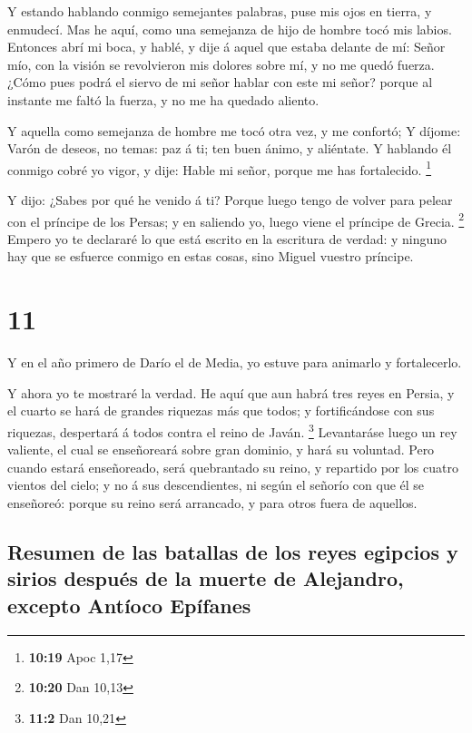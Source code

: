  Y estando hablando conmigo semejantes palabras, puse mis
ojos en tierra, y enmudecí.  Mas he aquí, como una
semejanza de hijo de hombre tocó mis labios. Entonces abrí mi boca, y
hablé, y dije á aquel que estaba delante de mí: Señor mío, con la visión
se revolvieron mis dolores sobre mí, y no me quedó fuerza. 
¿Cómo pues podrá el siervo de mi señor hablar con este mi señor? porque
al instante me faltó la fuerza, y no me ha quedado aliento.

 Y aquella como semejanza de hombre me tocó otra vez, y me
confortó;  Y díjome: Varón de deseos, no temas: paz á ti;
ten buen ánimo, y aliéntate. Y hablando él conmigo cobré yo vigor, y
dije: Hable mi señor, porque me has fortalecido. \footnote{\textbf{10:19}
  Apoc 1,17}

 Y dijo: ¿Sabes por qué he venido á ti? Porque luego tengo
de volver para pelear con el príncipe de los Persas; y en saliendo yo,
luego viene el príncipe de Grecia. \footnote{\textbf{10:20} Dan 10,13}
 Empero yo te declararé lo que está escrito en la escritura
de verdad: y ninguno hay que se esfuerce conmigo en estas cosas, sino
Miguel vuestro príncipe.

\hypertarget{section-10}{%
\section{11}\label{section-10}}

 Y en el año primero de Darío el de Media, yo estuve para
animarlo y fortalecerlo.

 Y ahora yo te mostraré la verdad. He aquí que aun habrá
tres reyes en Persia, y el cuarto se hará de grandes riquezas más que
todos; y fortificándose con sus riquezas, despertará á todos contra el
reino de Javán. \footnote{\textbf{11:2} Dan 10,21} 
Levantaráse luego un rey valiente, el cual se enseñoreará sobre gran
dominio, y hará su voluntad.  Pero cuando estará
enseñoreado, será quebrantado su reino, y repartido por los cuatro
vientos del cielo; y no á sus descendientes, ni según el señorío con que
él se enseñoreó: porque su reino será arrancado, y para otros fuera de
aquellos.

\hypertarget{resumen-de-las-batallas-de-los-reyes-egipcios-y-sirios-despuuxe9s-de-la-muerte-de-alejandro-excepto-antuxedoco-epuxedfanes}{%
\subsection{Resumen de las batallas de los reyes egipcios y sirios
después de la muerte de Alejandro, excepto Antíoco
Epífanes}\label{resumen-de-las-batallas-de-los-reyes-egipcios-y-sirios-despuuxe9s-de-la-muerte-de-alejandro-excepto-antuxedoco-epuxedfanes}}

